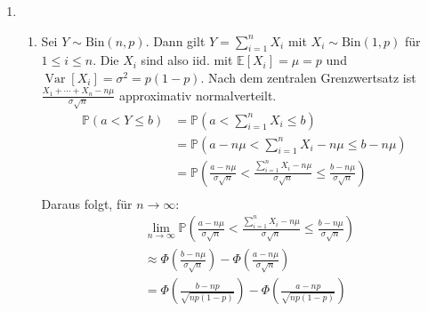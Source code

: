 \documentclass[a4paper]{scrartcl}
\newcommand{\prob}{\mathbb{P}}
\newcommand{\e}{\mathbb{E}}
\newcommand{\var}{\operatorname{Var}}
\def \blattnr {5}
\begin{document}
\begin{enumerate}[label=\bfseries \blattnr.\arabic*]
\begin{enumerate}
        \end{enumerate}
   
    \item
        \begin{enumerate}
            \item
                Sei $Y \sim \text{Bin}(n, p)$. Dann gilt $Y = \sum_{i=1}^n X_i$
                mit $X_i \sim \text{Bin}(1, p)$ für $1 \leq i \leq n$. Die
                $X_i$ sind also iid. mit $\e[X_i] = \mu = p$ und $\var[X_i] =
                \sigma^2 = p(1-p)$.
                Nach dem zentralen Grenzwertsatz ist $\frac{X_1 + \dotsb + X_n
                -n\mu}{\sigma\sqrt{n}}$ approximativ normalverteilt.
                \begin{equation*}
                    \begin{split}
                        \prob(a < Y \leq b)
                        &= \prob \left( a < \sum_{i=1}^n X_i \leq b \right) \\
                        &= \prob \left( a-n\mu < \sum_{i=1}^n X_i -n\mu \leq
                            b-n\mu \right) \\
                        &= \prob \left( \frac{a-n\mu}{\sigma\sqrt{n}} <
                            \frac{\sum_{i=1}^n X_i -n\mu}{\sigma\sqrt{n}} \leq
                            \frac{b-n\mu}{\sigma\sqrt{n}} \right) \\
                            \end{split}
                \end{equation*}  
                Daraus folgt, für $n \to \infty$:       
                \begin{equation*}
                    \begin{split}    
                        &  \lim_{n\to\infty} \prob\left( \frac{a-n\mu}{\sigma\sqrt{n}} <
                            \frac{\sum_{i=1}^n X_i -n\mu}{\sigma\sqrt{n}} \leq
                            \frac{b-n\mu}{\sigma\sqrt{n}} \right) \\
                        &\approx \Phi \left( \frac{b-n\mu}{\sigma\sqrt{n}}
                            \right) - \Phi \left( \frac{a-n\mu}{\sigma\sqrt{n}}
                            \right) \\
                        &= \Phi \left( \frac{b-np}{\sqrt{np(1-p)}} \right) -
                            \Phi \left( \frac{a-np}{\sqrt{np(1-p)}} \right)
                    \end{split}
                \end{equation*}


\end{enumerate}
\end{enumerate}
\end{document}
